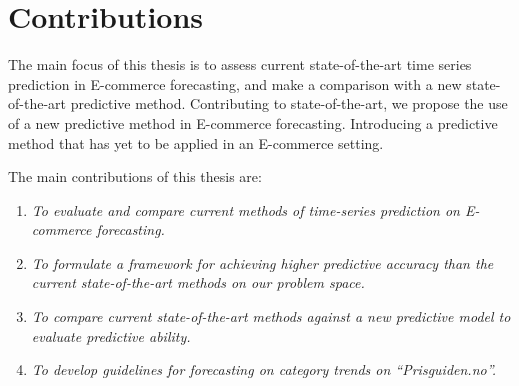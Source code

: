 \section{Contributions}
\label{sections:Introduction:Contributions}



The main focus of this thesis is to assess current state-of-the-art time series prediction in E-commerce forecasting,
and make a comparison with a new state-of-the-art predictive method.
Contributing to state-of-the-art,
we propose the use of a new predictive method in E-commerce forecasting.
Introducing a predictive method that has yet to be applied in an E-commerce setting.

The main contributions of this thesis are:
\begin{enumerate}
  \item {\it To evaluate and compare current methods of time-series prediction on E-commerce forecasting.}
  \item {\it To formulate a framework for achieving higher predictive accuracy than the current state-of-the-art methods on our problem space.}
  \item {\it To compare current state-of-the-art methods against a new predictive model to evaluate predictive ability.}
  \item {\it To develop guidelines for forecasting on category trends on ``Prisguiden.no''.}
\end{enumerate}




\iffalse
  The main focus of this work is to assess the current state of time-series prediction in E-commerce forecasting.
  Contributing to the current state of the art,
  we propose a method for increasing the predictive ability of time-series forecasting
  assessing interest trends of e-commerce product categories.
  The main contributions of this thesis are:

  \begin{enumerate}
    \item {\it To evaluate and compare current methods of time-series prediction on e-commerce.}
    \item {\it To evaluate and compare current state-of-the-art methods for time-series forecasting.}
    \item {\it Formulates a framework for achieving higher predictive accuracy than the current state-of-the-art methods on our problem space.}
  \end{enumerate}
\fi


